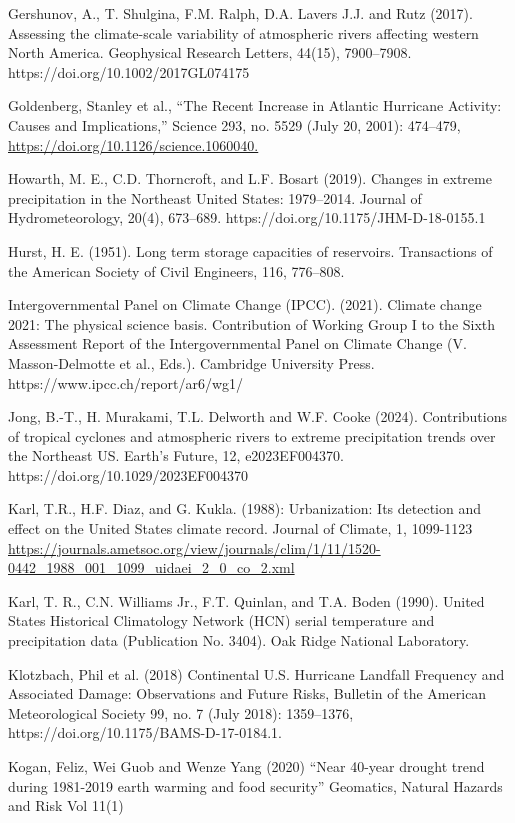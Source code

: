 \documentclass[12pt,paper=a4,DIV=12,parskip=never,chapterprefix=false,headings=standardclasses]{scrreprt}
\begin{document}
Gershunov, A., T. Shulgina, F.M. Ralph, D.A. Lavers J.J. and Rutz (2017). Assessing the climate-scale
variability of atmospheric rivers affecting western North America. Geophysical Research Letters,
44(15), 7900–7908. https://doi.org/10.1002/2017GL074175

Goldenberg, Stanley et al., “The Recent Increase in Atlantic Hurricane Activity: Causes and
Implications,” Science 293, no. 5529 (July 20, 2001): 474–479,
\url{https://doi.org/10.1126/science.1060040.}

Howarth, M. E., C.D. Thorncroft, and L.F. Bosart (2019). Changes in extreme precipitation in the
Northeast United States: 1979–2014. Journal of Hydrometeorology, 20(4), 673–689.
https://doi.org/10.1175/JHM-D-18-0155.1

Hurst, H. E. (1951). Long term storage capacities of reservoirs. Transactions of the American Society of
Civil Engineers, 116, 776–808.

Intergovernmental Panel on Climate Change (IPCC). (2021). Climate change 2021: The physical science
basis. Contribution of Working Group I to the Sixth Assessment Report of the Intergovernmental
Panel on Climate Change (V. Masson-Delmotte et al., Eds.). Cambridge University Press.
https://www.ipcc.ch/report/ar6/wg1/

Jong, B.-T., H. Murakami, T.L. Delworth and W.F. Cooke (2024). Contributions of tropical cyclones and
atmospheric rivers to extreme precipitation trends over the Northeast US. Earth’s Future, 12,
e2023EF004370. https://doi.org/10.1029/2023EF004370

Karl, T.R., H.F. Diaz, and G. Kukla. (1988): Urbanization: Its detection and effect on the United States
climate record. Journal of Climate, 1, 1099-1123
\url{https://journals.ametsoc.org/view/journals/clim/1/11/1520-
0442_1988_001_1099_uidaei_2_0_co_2.xml}

Karl, T. R., C.N. Williams Jr., F.T. Quinlan, and T.A. Boden (1990). United States Historical
Climatology Network (HCN) serial temperature and precipitation data (Publication No. 3404). Oak
Ridge National Laboratory.

Klotzbach, Phil et al. (2018) Continental U.S. Hurricane Landfall Frequency and Associated Damage:
Observations and Future Risks, Bulletin of the American Meteorological Society 99, no. 7 (July
2018): 1359–1376, https://doi.org/10.1175/BAMS-D-17-0184.1.

Kogan, Feliz, Wei Guob and Wenze Yang (2020) “Near 40-year drought trend during 1981-2019 earth
warming and food security” Geomatics, Natural Hazards and Risk Vol 11(1)
\end{document}
